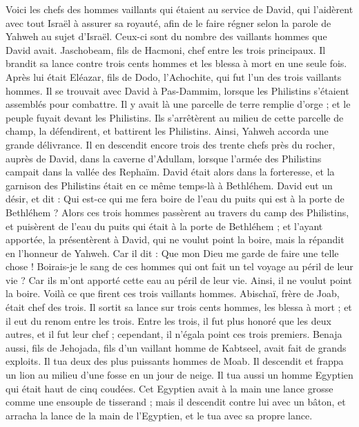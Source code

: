 \begin{multicols}{2}
Voici les chefs des hommes vaillants qui étaient au service de David, qui l'aidèrent avec tout Israël à assurer sa royauté, afin de le faire régner selon la parole de Yahweh au sujet d'Israël.
Ceux-ci sont du nombre des vaillants hommes que David avait. Jaschobeam, fils de Hacmoni, chef entre les trois principaux. Il brandit sa lance contre trois cents hommes et les blessa à mort en une seule fois.
Après lui était Eléazar, fils de Dodo, l'Achochite, qui fut l'un des trois vaillants hommes.
Il se trouvait avec David à Pas-Dammim, lorsque les Philistins s'étaient assemblés pour combattre. Il y avait là une parcelle de terre remplie d'orge ; et le peuple fuyait devant les Philistins.
Ils s'arrêtèrent au milieu de cette parcelle de champ, la défendirent, et battirent les Philistins. Ainsi, Yahweh accorda une grande délivrance.
Il en descendit encore trois des trente chefs près du rocher, auprès de David, dans la caverne d'Adullam, lorsque l'armée des Philistins campait dans la vallée des Rephaïm.
David était alors dans la forteresse, et la garnison des Philistins était en ce même temps-là à Bethléhem.
David eut un désir, et dit : Qui est-ce qui me fera boire de l'eau du puits qui est à la porte de Bethléhem ?
Alors ces trois hommes passèrent au travers du camp des Philistins, et puisèrent de l'eau du puits qui était à la porte de Bethléhem ; et l'ayant apportée, la présentèrent à David, qui ne voulut point la boire, mais la répandit en l'honneur de Yahweh.
Car il dit : Que mon Dieu me garde de faire une telle chose ! Boirais-je le sang de ces hommes qui ont fait un tel voyage au péril de leur vie ? Car ils m'ont apporté cette eau au péril de leur vie. Ainsi, il ne voulut point la boire. Voilà ce que firent ces trois vaillants hommes.
Abischaï, frère de Joab, était chef des trois. Il sortit sa lance sur trois cents hommes, les blessa à mort ; et il eut du renom entre les trois.
Entre les trois, il fut plus honoré que les deux autres, et il fut leur chef ; cependant, il n'égala point ces trois premiers.
Benaja aussi, fils de Jehojada, fils d'un vaillant homme de Kabtseel, avait fait de grands exploits. Il tua deux des plus puissants hommes de Moab. Il descendit et frappa un lion au milieu d'une fosse en un jour de neige.
Il tua aussi un homme Egyptien qui était haut de cinq coudées. Cet Egyptien avait à la main une lance grosse comme une ensouple de tisserand ; mais il descendit contre lui avec un bâton, et arracha la lance de la main de l'Egyptien, et le tua avec sa propre lance.

\end{multicols}
